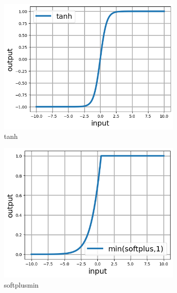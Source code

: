 \documentclass[12pt]{article}
\begin{document}
\begin{figure}[h]
\begin{subfigure}[b]{0.45\linewidth}
    \includegraphics[totalheight=4cm]{Figures/scripts/tanh.png}
    \caption{tanh}
  \end{subfigure}
  \begin{subfigure}[b]{0.45\linewidth}
    \includegraphics[totalheight=4cm]{Figures/scripts/minsoftplus.png}
    \caption{softplusmin}
  \end{subfigure}
  \begin{subfigure}[b]{0.45\linewidth}

\end{subfigure}
\end{figure}
\end{document}
